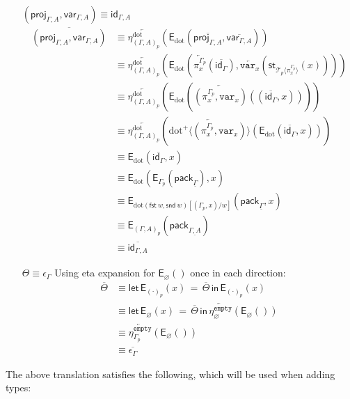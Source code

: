 \documentclass[10pt]{article}
\theoremstyle{definition}
\let\emptyset\varnothing
\newcommand\dsd[1]{\ensuremath{\mathsf{#1}}}
\newcommand{\app}[2]{\ensuremath{#1 \: #2}}
\newcommand{\fst}[1]{\app{\dsd{fst}}{#1}}
\newcommand{\snd}[1]{\app{\dsd{snd}}{#1}}
\newcommand{\id}{\mathsf{id}}
\newcommand{\rewrite}[2]{\overleftarrow{#1}(#2)}
\newcommand\E[2]{\ensuremath{\mathsf{E}_{#1}(#2)}}
\newcommand\StI[2]{\ensuremath{\mathsf{st}_{#1}(#2)}}
\newcommand\EEs[4]{\ensuremath{\mathsf{let} \, \mathsf{E}_{#1}(#3) \, = \, {#2} \, \mathsf{in} \, #4}}
\newcommand\EIs[2]{\ensuremath{\mathsf{E}_{#1}{(#2)}}}
\newcommand\ApEl[2]{\mathcal{T}_{#1}\langle#2\rangle}
\newcommand\ApPlus[2]{\ensuremath{{#1}^+ \langle #2 \rangle }}
\newcommand\pack[1]{\ensuremath{\mathsf{pack}_{#1}}}
\newcommand{\modeof}[1]{{#1}_p}
\newcommand{\tempty}{\ensuremath{\mathtt{empty}}}
\newcommand{\sdot}{\ensuremath{\mathrm{dot}}}
\newcommand{\upstairs}[1]{\overline{#1}}
\newcommand{\downstairs}[1]{\underline{#1}}
\newcommand\proj[1]{\ensuremath{\mathsf{proj}_{#1}}}
\newcommand\qvar[1]{\ensuremath{\mathsf{var}_{#1}}}
\newcommand\var[1]{\ensuremath{\mathtt{var}_{#1}}}
\begin{document}
\begin{enumerate}[style = multiline, labelwidth = 80pt]
\item[{$(\proj{\Gamma,A}, \qvar{\Gamma,A}) \equiv \id_{\Gamma, A}$}] 
\begin{align*}
\upstairs{(\proj{\Gamma,A}, \qvar{\Gamma,A})}
&\equiv \rewrite{\eta^\sdot_{\modeof{(\Gamma, A)}}}{\EIs{\sdot}{\upstairs{\proj{\Gamma,A}}, \upstairs{\qvar{\Gamma,A}}}} \\
&\equiv \rewrite{\eta^\sdot_{\modeof{(\Gamma, A)}}}{\EIs{\sdot}{\rewrite{\pi^{\modeof{\Gamma}}_x}{\upstairs{\id_\Gamma}}, \rewrite{\var{x}}{\StI{\ApEl{p}{\pi^{\modeof{\Gamma}}_x}}{x}}}} \\
&\equiv \rewrite{\eta^\sdot_{\modeof{(\Gamma, A)}}}{\EIs{\sdot}{\rewrite{(\pi^{\modeof{\Gamma}}_x, \var{x})}{(\upstairs{\id_\Gamma}, x)}}}\\
&\equiv \rewrite{\eta^\sdot_{\modeof{(\Gamma, A)}}}{\rewrite{\ApPlus{\sdot}{(\pi^{\modeof{\Gamma}}_x, \var{x})}}{\EIs{\sdot}{\upstairs{\id_\Gamma}, x}}}\\
&\equiv \EIs{\sdot}{\upstairs{\id_\Gamma}, x} \\
&\equiv \EIs{\sdot}{\EIs{\modeof{\Gamma}}{\pack{\downstairs{\Gamma}}}, x}\\
&\equiv \EIs{\sdot(\fst w, \snd w)[(\modeof{\Gamma}, x)/w]}{\pack{\downstairs{\Gamma}}, x} \\
&\equiv \EIs{\modeof{(\Gamma, A)}}{\pack{\downstairs{\Gamma, A}}} \\
&\equiv \upstairs{\id_{\Gamma, A}}
\end{align*}

\item[$\Theta \equiv \epsilon_\Gamma$] 
Using eta expansion for $\E{\emptyset}{}$ once in each direction:
\begin{align*}
\upstairs{\Theta}
&\equiv \EEs{\modeof{(\cdot)}}{\upstairs{\Theta}}{x}{\EIs{\modeof{(\cdot)}}{x}} \\
&\equiv \EEs{\emptyset}{\upstairs{\Theta}}{x}{\rewrite{\eta^\tempty_{\emptyset}}{\EIs{\emptyset}{}}} \\
&\equiv \rewrite{\eta^\tempty_{\modeof{\Gamma}}}{\EIs{\emptyset}{}} \\
&\equiv \upstairs{\epsilon_\Gamma}
\end{align*}
\end{enumerate}

The above translation satisfies the following, which will be used when
adding types:
\end{document}
